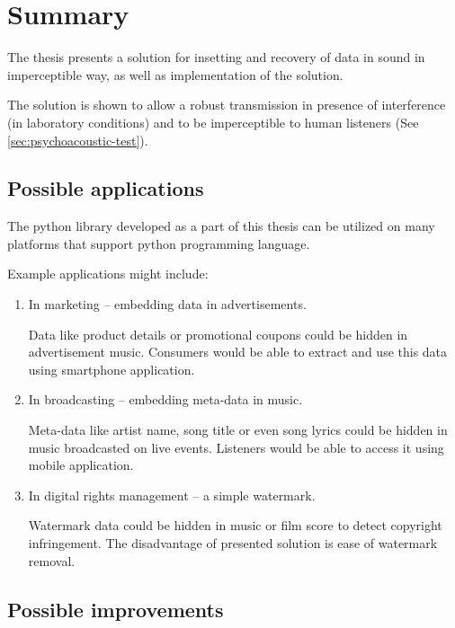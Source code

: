 \chapter{Summary}
\label{chap:summary}

The thesis presents a solution for insetting and recovery of data in sound in imperceptible way, as well as
implementation of the solution.

The solution is shown to allow a robust transmission in presence of interference (in laboratory conditions) and to be
imperceptible to human listeners (See \ref{sec:psychoacoustic-test}).

\section{Possible applications}

The python library developed as a part of this thesis can be utilized on many platforms that support python programming language.

Example applications might include:

\begin{enumerate}
\item In marketing -- embedding data in advertisements.

Data like product details or promotional coupons could be hidden in advertisement music. Consumers would be able to
extract and use this data using smartphone application.

\item In broadcasting -- embedding meta-data in music.

Meta-data like artist name, song title or even song lyrics could be hidden in music broadcasted on live events.
Listeners would be able to access it using mobile application.

\item In digital rights management -- a simple watermark.

Watermark data could be hidden in music or film score to detect copyright infringement. The disadvantage of presented
solution is ease of watermark removal.
\end{enumerate}

\section{Possible improvements}

